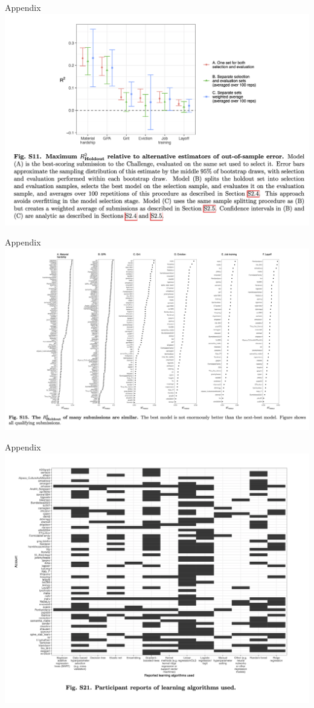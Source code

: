\documentclass{beamer}
\begin{document}
\begin{frame}{Appendix}
\includegraphics[width = \textwidth]{figures/si_ensemble}
\end{frame}

\begin{frame}{Appendix}
\includegraphics[width = \textwidth]{figures/si_best_teams}
\end{frame}

\begin{frame}{Appendix}
\includegraphics[width = \textwidth]{figures/si_algorithms}
\end{frame}
\end{document}
